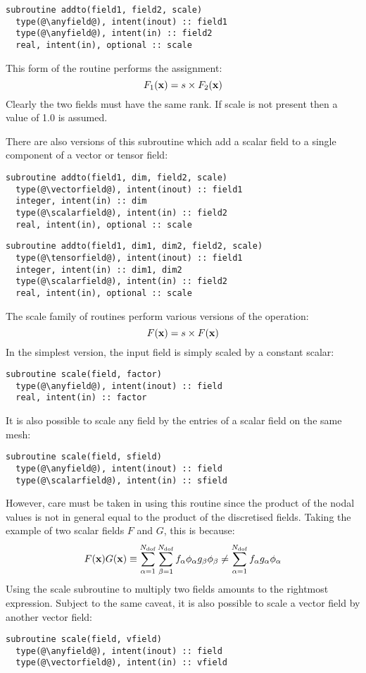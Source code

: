 \documentclass[a4paper, 11pt]{book}
\begin{document}
\begin{lstlisting}
subroutine addto(field1, field2, scale)
  type(@\anyfield@), intent(inout) :: field1
  type(@\anyfield@), intent(in) :: field2
  real, intent(in), optional :: scale
\end{lstlisting}

This form of the routine performs the assignment:
\begin{equation}
  F_1(\mathbf{x}) = s \times F_2(\mathbf{x})
\end{equation}
Clearly the two fields must have the same rank. If scale is not present then
a value of 1.0 is assumed. 

There are also versions of this subroutine which add a scalar field to a
single component of a vector or tensor field:
\begin{lstlisting}
subroutine addto(field1, dim, field2, scale)
  type(@\vectorfield@), intent(inout) :: field1
  integer, intent(in) :: dim
  type(@\scalarfield@), intent(in) :: field2
  real, intent(in), optional :: scale
\end{lstlisting}
\begin{lstlisting}
subroutine addto(field1, dim1, dim2, field2, scale)
  type(@\tensorfield@), intent(inout) :: field1
  integer, intent(in) :: dim1, dim2
  type(@\scalarfield@), intent(in) :: field2
  real, intent(in), optional :: scale
\end{lstlisting}


The scale family of routines perform various versions of the operation:
\begin{equation}
  F(\mathbf{x}) = s \times F(\mathbf{x})
\end{equation}
In the simplest version, the input field is simply scaled by a constant
scalar:
\begin{lstlisting}
subroutine scale(field, factor)
  type(@\anyfield@), intent(inout) :: field
  real, intent(in) :: factor
\end{lstlisting}
It is also possible to scale any field by the entries of a scalar field on
the same mesh:
\begin{lstlisting}
subroutine scale(field, sfield)
  type(@\anyfield@), intent(inout) :: field
  type(@\scalarfield@), intent(in) :: sfield
\end{lstlisting}
However, care must be taken in using this routine since the product of the
nodal values is not in general equal to the product of the discretised
fields. Taking the example of two scalar fields $F$ and $G$, this is because:
\begin{equation}
  F(\mathbf{x})G(\mathbf{x})\equiv\sum_{\alpha=1}^{N_\mathrm{dof}}\sum_{\beta=1}^{N_\mathrm{dof}}
  f_\alpha\phi_\alpha g_\beta\phi_\beta
  \neq\sum_{\alpha=1}^{N_\mathrm{dof}}f_\alpha g_\alpha\phi_\alpha
\end{equation}
Using the scale subroutine to multiply two fields amounts to the rightmost
expression. Subject to the same caveat, it is also possible to scale a
vector field by another vector field:
\begin{lstlisting}
subroutine scale(field, vfield)
  type(@\anyfield@), intent(inout) :: field
  type(@\vectorfield@), intent(in) :: vfield  
\end{lstlisting}
\end{document}
